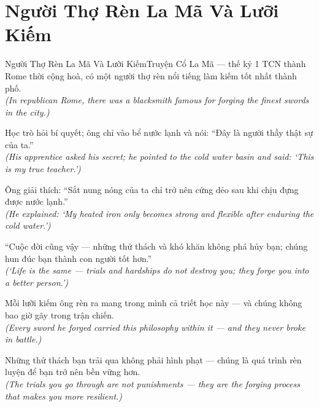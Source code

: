 \section{Người Thợ Rèn La Mã Và Lưỡi Kiếm}
\begin{truyen}{Người Thợ Rèn La Mã Và Lưỡi Kiếm}{Truyện Cổ La Mã --- thế kỷ 1 TCN}
 thành Rome thời cộng hoà, có một người thợ rèn nổi tiếng làm kiếm tốt nhất thành phố.\\[4pt]
\textit{(In republican Rome, there was a blacksmith famous for forging the finest swords in the city.)}

Học trò hỏi bí quyết; ông chỉ vào bể nước lạnh và nói: ``Đây là người thầy thật sự của ta.''\\[4pt]
\textit{(His apprentice asked his secret; he pointed to the cold water basin and said: `This is my true teacher.')}

Ông giải thích: ``Sắt nung nóng của ta chỉ trở nên cứng dẻo sau khi chịu đựng được nước lạnh.''\\[4pt]
\textit{(He explained: `My heated iron only becomes strong and flexible after enduring the cold water.')}

``Cuộc đời cũng vậy --- những thử thách và khó khăn không phá hủy bạn; chúng hun đúc bạn thành con người tốt hơn.''\\[4pt]
\textit{(`Life is the same --- trials and hardships do not destroy you; they forge you into a better person.')}

Mỗi lưỡi kiếm ông rèn ra mang trong mình cả triết học này --- và chúng không bao giờ gãy trong trận chiến.\\[4pt]
\textit{(Every sword he forged carried this philosophy within it --- and they never broke in battle.)}

\end{truyen}
\begin{baihoc}
  Những thử thách bạn trải qua không phải hình phạt --- chúng là quá trình rèn luyện để bạn trở nên bền vững hơn.\\[4pt]
  \textit{(The trials you go through are not punishments --- they are the forging process that makes you more resilient.)}
\end{baihoc}

